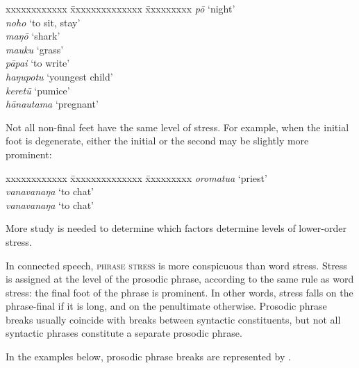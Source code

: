 \ea
\begin{tabbing}
 xxxxxxxxxxxx \= xxxxxxxxxxxxxx \= xxxxxxxxx \kill
  \textit{pō} \>  \> ‘night’\\
  \textit{noho} \>  \> ‘to sit, stay’\\
 \textit{maŋō} \>  \> ‘shark’\\
 \textit{mauku} \>  \> ‘grass’\\
 \textit{pāpa{\ꞌ}i} \>  \> ‘to write’\\
 \textit{haŋupotu} \>  \> ‘youngest child’\\
 \textit{keretū} \>  \> ‘pumice’\\
 \textit{hānautama} \>  \> ‘pregnant’
\end{tabbing}
\z 
Not all non-final feet have the same level of stress. For example, when the initial foot is degenerate, either the initial or the second  may be slightly more prominent:

\ea
\begin{tabbing}
 xxxxxxxxxxxx \= xxxxxxxxxxxxxx \= xxxxxxxxx \kill
 \textit{oromatu{\ꞌ}a} \>  \> ‘priest’\\
 \textit{vanavanaŋa}  \>  \> ‘to chat’\\
 \textit{vanavanaŋa} \>  \> ‘to chat’
\end{tabbing}
\z
More study is needed to determine which factors determine levels of lower-order stress.

In connected speech, \textsc{phrase stress} is more conspicuous than word stress. Stress is assigned at the level of the prosodic phrase, according to the same rule as word stress: the final foot of the phrase is prominent. In other words, stress falls on the phrase-final  if it is long, and on the penultimate  otherwise. Prosodic phrase breaks usually coincide with breaks between syntactic constituents, but not all syntactic phrases constitute a separate prosodic phrase.

In the examples below, prosodic phrase breaks are represented by {\textbar}. 

